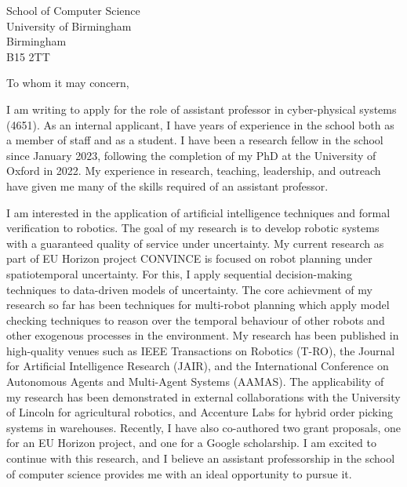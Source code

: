\documentclass[12pt]{letter}
\begin{document}
\begin{letter}{School of Computer Science \\ University of Birmingham \\ Birmingham \\ B15 2TT}
\opening{To whom it may concern,}


I am writing to apply for the role of assistant professor in cyber-physical systems (4651).
%
As an internal applicant, I have years of experience in the school both as a member of staff and as a student.
%
I have been a research fellow in the school since January 2023, following the completion of my PhD at the University of Oxford in 2022.
%
My experience in research, teaching, leadership, and outreach have given me many of the skills required of an assistant professor.



%
I am interested in the application of artificial intelligence techniques and formal verification to robotics.
%
The goal of my research is to develop robotic systems with a guaranteed quality of service under uncertainty.
%
My current research as part of EU Horizon project CONVINCE is focused on robot planning under spatiotemporal uncertainty.
%
For this, I apply sequential decision-making techniques to data-driven models of uncertainty.
%
The core achievment of my research so far has been techniques for multi-robot planning which apply model checking techniques to reason over the temporal behaviour of other robots and other exogenous processes in the environment.
%
My research has been published in high-quality venues such as IEEE Transactions on Robotics (T-RO), the Journal for Artificial Intelligence Research (JAIR), and the International Conference on Autonomous Agents and Multi-Agent Systems (AAMAS).
%
The applicability of my research has been demonstrated in external collaborations with the University of Lincoln for agricultural robotics, and Accenture Labs for hybrid order picking systems in warehouses.
%
Recently, I have also co-authored two grant proposals, one for an EU Horizon project, and one for a Google scholarship.
%
I am excited to continue with this research, and I believe an assistant professorship in the school of computer science provides me with an ideal opportunity to pursue it.


\end{letter}
\end{document}
